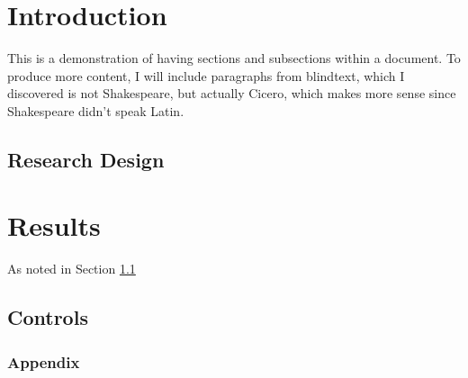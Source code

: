 \documentclass{article}%
\begin{document}

\section{Introduction}

        This is a demonstration of having sections and subsections within a document. To produce more content, I will include paragraphs from blindtext, which I discovered is not Shakespeare, but actually Cicero, which makes more sense since Shakespeare didn't speak Latin.

\subsection{Research Design}\label{section:Research Design}

        \blindtext

\section{Results}

        \blindtext[2] As noted in Section \ref{section:Research Design}

\subsection{Controls}

        \blindtext

\subsubsection{Appendix}

        \blindtext
\end{document}
